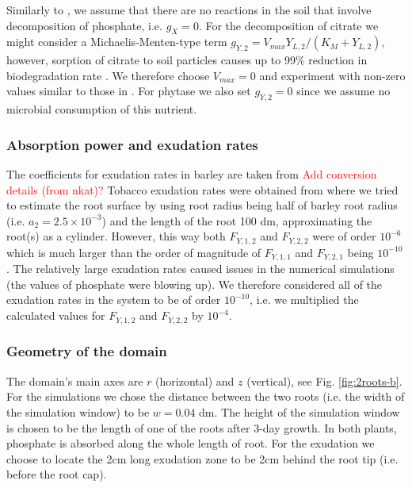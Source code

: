 \documentclass[11pt]{article}
\begin{document}
Similarly to \cite{Ptashnyk-2011}, we assume that there are no reactions in the soil that involve decomposition of phosphate, i.e. $g_X = 0$. For the decomposition of citrate we might consider a Michaelis-Menten-type term $g_{Y,2} = V_{max} Y_{L,2} / (K_M + Y_{L,2})$, however, sorption of citrate to soil particles causes up to 99\% reduction in biodegradation rate \cite{McKayFletcher-2019}. We therefore choose $V_{max} = 0$ and experiment with non-zero values similar to those in \cite{Ptashnyk-2011}. For phytase we also set $g_{Y,2} = 0$ since we assume no microbial consumption of this nutrient.

\subsubsection{Absorption power and exudation rates}
The coefficients for exudation rates in barley are taken from \cite{Ruiz-2020} \textcolor{red}{Add conversion details (from nkat)?} Tobacco exudation rates were obtained from \cite{giles_george} where we tried to estimate the root surface by using root radius being half of barley root radius (i.e. $a_2 = 2.5 \times 10^{-3}$) and the length of the root 100 dm, approximating the root(s) as a cylinder. However, this way both $F_{Y,1,2}$ and $F_{Y,2,2}$ were of order $10^{-6}$ which is much larger than the order of magnitude of $F_{Y,1,1}$ and $F_{Y,2,1}$ being $10^{-10}$. The relatively large exudation rates caused issues in the numerical simulations (the values of phosphate were blowing up). We therefore considered all of the exudation rates in the system to be of order $10^{-10}$, i.e. we multiplied the calculated values for $F_{Y,1,2}$ and $F_{Y,2,2}$ by $10^{-4}$.

\subsubsection{Geometry of the domain}
The domain's main axes are $r$ (horizontal) and $z$ (vertical), see Fig. \ref{fig:2roots-b}. For the simulations we chose the distance between the two roots (i.e. the width of the simulation window) to be $w = 0.04$ dm. The height of the simulation window is chosen to be the length of one of the roots after 3-day growth. In both plants, phosphate is absorbed along the whole length of root. For the exudation we choose to locate the 2cm long exudation zone to be 2cm behind the root tip (i.e. before the root cap).
\end{document}
